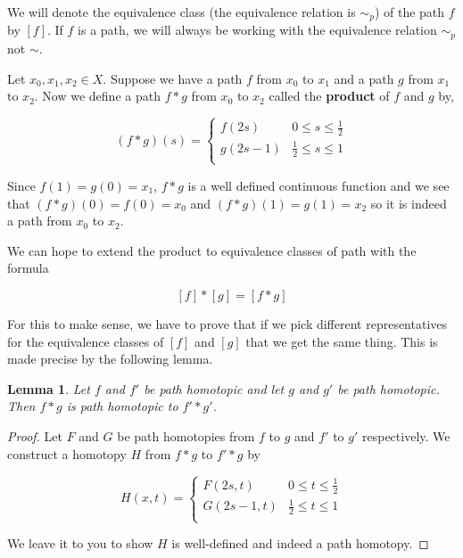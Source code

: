 \documentclass[a4paper]{article}
\newtheorem{lemma}[theorem]{Lemma}
\numberwithin{theorem}{section}
\begin{document}
We will denote the equivalence class (the equivalence relation is $\sim_p$) of the path $f$ by $[f]$. If $f$ is a path, we will always be working with the equivalence relation $\sim_p$ not $\sim$.

Let $x_0,x_1,x_2 \in X$. Suppose we have a path $f$ from $x_0$ to $x_1$ and a path $g$ from $x_1$ to $x_2$. Now we define a path $f \ast g$ from $x_0$ to $x_2$ called the \textbf{product} of $f$ and $g$ by,

\[ (f \ast g)(s) =  \left\{
\begin{array}{ll}
      f(2s) & 0 \leq s \leq \frac{1}{2} \\
      g(2s-1) & \frac{1}{2} \leq s \leq 1 \\
\end{array} 
\right. \]

Since $f(1) = g(0) = x_1$, $f \ast g$ is a well defined continuous function and we see that $(f \ast g)(0) = f(0) = x_0$ and $(f \ast g)(1) = g(1) = x_2$ so it is indeed a path from $x_0$ to $x_2$.

We can hope to extend the product to equivalence classes of path with the formula

$$ [f] \ast [g] = [f \ast g] $$

For this to make sense, we have to prove that if we pick different representatives for the equivalence classes of $[f]$ and $[g]$ that we get the same thing. This is made precise by the following lemma.

\begin{lemma}
Let $f$ and $f'$ be path homotopic and let $g$ and $g'$ be path homotopic. Then $f \ast g$ is path homotopic to $f' \ast g'$.
\end{lemma}

\begin{proof}
Let $F$ and $G$ be path homotopies from $f$ to $g$ and $f'$ to $g'$ respectively. We construct a homotopy $H$ from $f \ast g$ to $f' \ast g$ by

\[ H(x,t) =  \left\{
\begin{array}{ll}
      F(2s,t) & 0 \leq t \leq \frac{1}{2} \\
      G(2s-1,t) & \frac{1}{2} \leq t \leq 1 \\
\end{array} 
\right. \]

We leave it to you to show $H$ is well-defined and indeed a path homotopy.

\end{proof}
\end{document}
